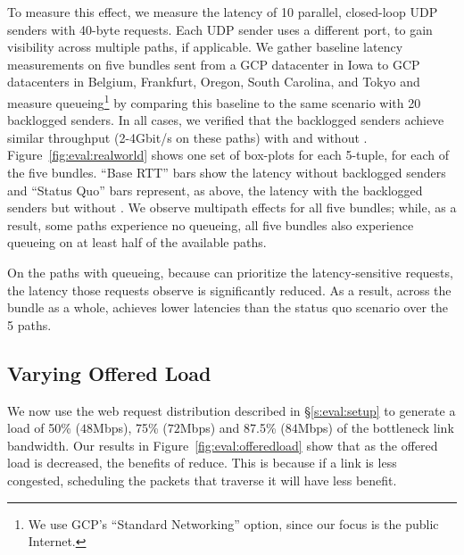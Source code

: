 To measure this effect, we measure the latency of 10 parallel, closed-loop UDP senders with 40-byte requests. Each UDP sender uses a different port, to gain visibility across multiple paths, if applicable.
We gather baseline latency measurements on five bundles sent from a GCP datacenter in Iowa to GCP datacenters in Belgium, Frankfurt, Oregon, South Carolina, and Tokyo and measure queueing\footnote{We use GCP's ``Standard Networking'' option, since our focus is the public Internet.}
by comparing this baseline to the same scenario with 20 backlogged senders.
In all cases, we verified that the backlogged senders achieve similar throughput (2-4Gbit/s on these paths) with and without \name.
Figure~\ref{fig:eval:realworld} shows one set of box-plots for each 5-tuple, for each of the five bundles. ``Base RTT'' bars show the latency without backlogged senders and ``Status Quo'' bars represent, as above, the latency with the backlogged senders but without \name.
We observe multipath effects for all five bundles; while, as a result, some paths experience no queueing, all five bundles also experience queueing on at least half of the available paths.

On the paths with queueing, because \name can prioritize the latency-sensitive requests, the latency those requests observe is significantly reduced. As a result, across the bundle as a whole, \name achieves \realworldMedianLatencyImprovement lower latencies than the status quo scenario over the 5 paths.



\begin{Appendix}
\section{Varying Offered Load}\label{s:eval:offeredload}
We now use the web request distribution described in \S\ref{s:eval:setup} to generate a load of 50\% ($48$Mbps), 75\% ($72$Mbps) and 87.5\% ($84$Mbps) of the bottleneck link bandwidth. Our results in Figure~\ref{fig:eval:offeredload} show that as the offered load is decreased, the benefits of \name reduce. This is because if a link is less congested, scheduling the packets that traverse it will have less benefit.


\end{Appendix}

